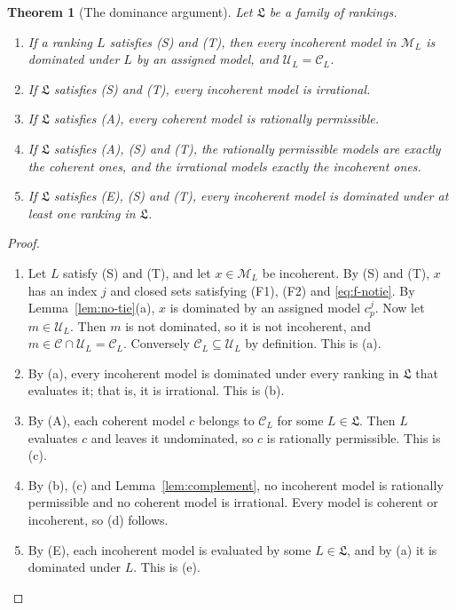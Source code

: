 \documentclass[11pt]{article}
\newtheorem{theorem}{Theorem}[section]
\theoremstyle{definition}
\theoremstyle{remark}
\newcommand{\M}{\mathcal M}
\newcommand{\C}{\mathcal C}
\newcommand{\U}{\mathcal U}
\newcommand{\Lf}{\mathfrak L}
\begin{document}
\begin{theorem}[The dominance argument]\label{thm:argument}
Let $\Lf$ be a family of rankings.
\begin{enumerate}[label=(\alph*)]
\item If a ranking $L$ satisfies {\color{red}(S)} and {\color{red}(T)}, then every incoherent model in $\M_L$ is dominated under $L$ by an assigned model, and $\U_L=\C_L$.
\item If $\Lf$ satisfies {\color{red}(S)} and {\color{red}(T)}, every incoherent model is irrational.
\item If $\Lf$ satisfies (A), every coherent model is rationally permissible.
\item If $\Lf$ satisfies (A), {\color{red}(S)} and {\color{red}(T)}, the rationally permissible models are exactly the coherent ones, and the irrational models exactly the incoherent ones.
\item If $\Lf$ satisfies (E), {\color{red}(S)} and {\color{red}(T)}, every incoherent model is dominated under at least one ranking in $\Lf$.
\end{enumerate}
\end{theorem}
\begin{proof}
\leavevmode
\begin{enumerate}[label=\arabic*.,leftmargin=*]
\item Let $L$ satisfy {\color{red}(S)} and {\color{red}(T)}, and let $x\in\M_L$ be incoherent. {\color{red}By (S) and (T), $x$ has an index $j$ and closed sets satisfying (F1), (F2) and \eqref{eq:f-notie}. By Lemma~\ref{lem:no-tie}(a), $x$ is dominated by an assigned model $c^j_p$.} Now let $m\in\U_L$. Then $m$ is not dominated, so it is not incoherent, and $m\in\C\cap\U_L=\C_L$. Conversely $\C_L\subseteq\U_L$ by definition. This is (a).
\item By (a), every incoherent model is dominated under every ranking in $\Lf$ that evaluates it; that is, it is irrational. This is (b).
\item By (A), each coherent model $c$ belongs to $\C_L$ for some $L\in\Lf$. Then $L$ evaluates $c$ and leaves it undominated, so $c$ is rationally permissible. This is (c).
\item By (b), (c) and Lemma~\ref{lem:complement}, no incoherent model is rationally permissible and no coherent model is irrational. Every model is coherent or incoherent, so (d) follows.
\item By (E), each incoherent model is evaluated by some $L\in\Lf$, and by (a) it is dominated under $L$. This is (e).\qedhere
\end{enumerate}
\end{proof}
\end{document}
